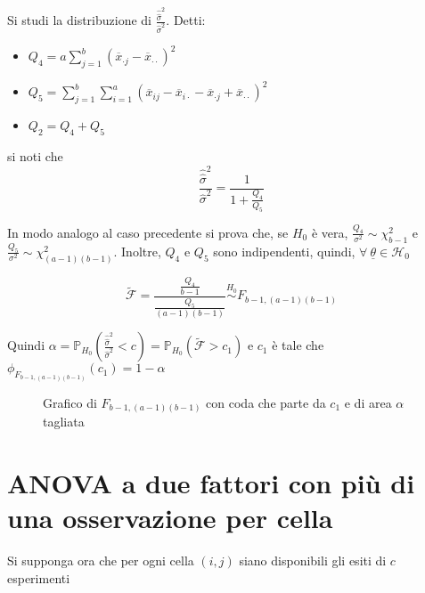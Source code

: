 \documentclass[hidelinks, 10pt]{article}
\begin{document}
Si studi la distribuzione di $ \frac{\hat{\hat{\sigma}}^{2}}{\hat{\sigma}^{2}} $. Detti:
\begin{itemize}
\item $ Q_{4} = a \sum\limits_{j = 1}^{b} (\overline{x}_{\cdot j} - \overline{x}_{\cdot \cdot})^{2} $
\item $ Q_{5} = \sum\limits_{j = 1}^{b} \sum\limits_{i = 1}^{a} (\overline{x}_{i j} - \overline{x}_{i \cdot} - \overline{x}_{\cdot j} + \overline{x}_{\cdot \cdot})^{2} $
\item $ Q_{2} = Q_{4} + Q_{5} $
\end{itemize}

si noti che
\[ \frac{\hat{\hat{\sigma}}^{2}}{\hat{\sigma}^{2}} = \frac{1}{1 + \frac{Q_{4}}{Q_{5}}} \]

In modo analogo al caso precedente si prova che, se $ H_{0} $ \`e vera, $ \frac{Q_{4}}{\sigma^{2}} \sim \chi^{2}_{b - 1} $ e $ \frac{Q_{5}}{\sigma^{2}} \sim \chi^{2}_{(a - 1)(b - 1)} $. Inoltre, $ Q_{4} $ e $ Q_{5} $ sono indipendenti, quindi, $ \forall\ \underline{\theta} \in \mathcal{H}_{0} $

\[ \tilde{\mathcal{F}} = \frac{\frac{Q_{4}}{b - 1}}{\frac{Q_{5}}{(a - 1)(b - 1)}} \stackrel{H_{0}}{\sim} F_{b - 1, (a - 1)(b - 1)} \]

Quindi $ \alpha = \mathbb{P}_{H_{0}} \left( \frac{\hat{\hat{\sigma}}^{2}}{\hat{\sigma}^{2}} < c \right) = \mathbb{P}_{H_{0}} \left( \tilde{\mathcal{F}} > c_{1} \right) $ e $ c_{1} $ \`e tale che $ \phi_{F_{b - 1, (a - 1)(b - 1)}} (c_{1}) = 1 - \alpha $

\begin{center}
\begin{figure}[H]
\caption{Grafico di $ F_{b - 1, (a - 1)(b - 1)} $ con coda che parte da $ c_{1} $ e di area $ \alpha $ tagliata}
\end{figure}
\end{center}

\section{ANOVA a due fattori con pi\`u di una osservazione per cella}
Si supponga ora che per ogni cella $ (i, j) $ siano disponibili gli esiti di $ c $ esperimenti
\end{document}

